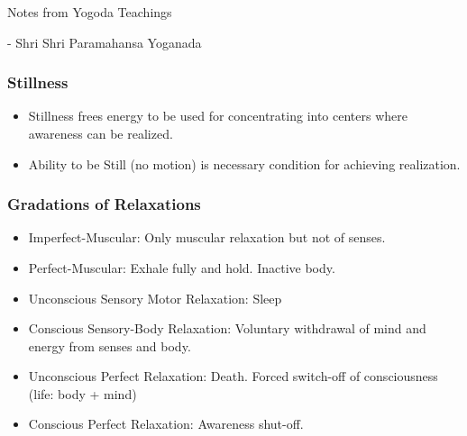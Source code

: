 \begin{frame}[fragile]\frametitle{}
\begin{center}
{\Large Notes from Yogoda Teachings}

- Shri Shri Paramahansa Yoganada
\end{center}
\end{frame}

\begin{frame}[fragile]\frametitle{Stillness}

	\begin{itemize}
	\item Stillness frees energy to be used for concentrating into centers where awareness can be realized.
	\item Ability to be Still (no motion) is necessary condition for achieving realization.
	\end{itemize}

\end{frame}


\begin{frame}[fragile]\frametitle{Gradations of Relaxations}
	\begin{itemize}
	\item Imperfect-Muscular: Only muscular relaxation but not of senses.
	\item Perfect-Muscular: Exhale fully and hold. Inactive body.
	\item Unconscious Sensory Motor Relaxation: Sleep
	\item Conscious Sensory-Body Relaxation: Voluntary withdrawal of mind and energy from senses and body.
	\item Unconscious Perfect Relaxation: Death. Forced switch-off of consciousness (life: body + mind)
	\item Conscious Perfect Relaxation: Awareness shut-off.
	\end{itemize}

\end{frame}